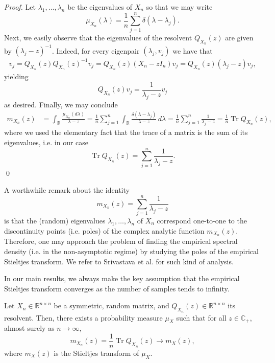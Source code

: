 \documentclass{article}
\begin{document}
\bigskip
\noindent
\emph{Proof.} Let $\lambda_1,\dots,\lambda_n$ be the eigenvalues of $X_n$ so that we may write
\begin{equation}
\mu_{X_n}(\lambda)=\frac{1}{n}\sum_{j=1}^n\delta(\lambda-\lambda_j).
\end{equation}
Next, we easily observe that the eigenvalues of the resolvent $Q_{X_n}(z)$ are given by $(\lambda_j-z)^{-1}$. Indeed, for every eigenpair $(\lambda_j,v_j)$ we have that
\begin{align}
v_j=Q_{X_n}(z)Q_{X_n}(z)^{-1}v_j = Q_{X_n}(z)(X_n-zI_n)v_j = Q_{X_n}(z)(\lambda_j-z)v_j,
\end{align}
yielding
\begin{equation}
Q_{X_n}(z)v_j=\frac{1}{\lambda_j-z}v_j
\end{equation}
as desired. Finally, we may conclude
\begin{align}
m_{X_n}(z) &= \int_{\mathbb{R}}\frac{\mu_{X_n}(d\lambda)}{\lambda-z} = \frac{1}{n}\sum_{j=1}^n\int_{\mathbb{R}}\frac{\delta(\lambda-\lambda_j)}{\lambda-z}\,d\lambda = \frac{1}{n}\sum_{j=1}^n\frac{1}{\lambda_j-z} = \frac{1}{n}\operatorname{Tr}Q_{X_n}(z),
\end{align}
where we used the elementary fact that the trace of a matrix is the sum of its eigenvalues, i.e. in our case
\begin{equation}
\operatorname{Tr}Q_{X_n}(z)=\sum_{j=1}^n\frac{1}{\lambda_j-z}.
\end{equation}
\qed
\bigskip
\par
A worthwhile remark about the identity
\begin{equation}
m_{X_n}(z)=\sum_{j=1}^n\frac{1}{\lambda_j-z}
\end{equation}
is that the (random) eigenvalues $\lambda_1,\dots,\lambda_n$ of $X_n$ correspond one-to-one to the discontinuity points (i.e. poles) of the complex analytic function $m_{X_n}(z)$. Therefore, one may approach the problem of finding the empirical spectral density (i.e. in the non-asymptotic regime) by studying the poles of the empirical Stieltjes transform. We refer to Srivastava et al. \cite{srivastava} for such kind of analysis.
\bigskip
\par
In our main results, we always make the key assumption that the empirical Stieltjes transform converges as the number of samples tends to infinity.
\bigskip
\begin{assumption}\label{ass:key-assumption}
Let $X_n\in\mathbb{R}^{n\times n}$ be a symmetric, random matrix, and $Q_{X_n}(z)\in\mathbb{R}^{n\times n}$ its resolvent. Then, there exists a probability measure $\mu_X$ such that for all $z\in\mathbb{C}_+$, almost surely as $n\to\infty$,
\begin{equation}
m_{X_n}(z)=\frac{1}{n}\operatorname{Tr}Q_{X_n}(z)\to m_X(z),\label{eq:key-assumption}
\end{equation}
where $m_X(z)$ is the Stieltjes transform of $\mu_X$.\label{ass:stieltjes-convergence}
\end{assumption}
\end{document}
